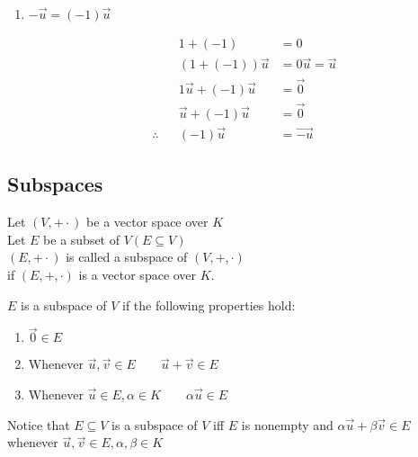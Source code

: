 \documentclass[12pt]{article}
\renewcommand{\v}[1]{\overrightarrow{#1}}
\newenvironment{proof}{\block[Proof]}{\endblock}
\begin{document}
\begin{proof}
\begin{enumerate}
		\item $-\v{u} = (-1) \v{u}$
		
		\begin{equation}
		\begin{alignedat}{2}
		&& 1 + (-1) &= 0 \\
		&& (1 + (-1)) \v{u} &= 0 \v{u} = \v{u} \\
		&& 1 \v{u} + (-1) \v{u} &= \v{0} \\
		&& \v{u} + (-1) \v{u} &= \v{0} \\
		\therefore && (-1) \v{u} &= \v{-u}
		\end{alignedat}
		\end{equation}
		
	\end{enumerate}
\end{proof}


\subsection{Subspaces}

Let $(V, + \cdot)$ be a vector space over $K$ \\
Let $E$ be a subset of $V (E \subseteq V)$ \\
$(E, + \cdot)$ is called a subspace of $(V, +, \cdot)$ \\
if $(E, +, \cdot)$ is a vector space over $K$.
	

$E$ is a subspace of $V$ if the following properties hold:

\begin{enumerate}
	\item $\v{0} \in E$ 
	\item Whenever $\v{u}, \v{v} \in E \qquad \v{u} + \v{v} \in E$
	\item Whenever $\v{u} \in E, \alpha \in K \qquad \alpha \v{u} \in E$
\end{enumerate}


Notice that $E \subseteq V$ is a subspace of $V$ iff $E$ is nonempty and $\alpha \v{u} + \beta \v{v} \in E$ whenever $\v{u}, \v{v} \in E, \alpha, \beta \in K$
\end{document}
